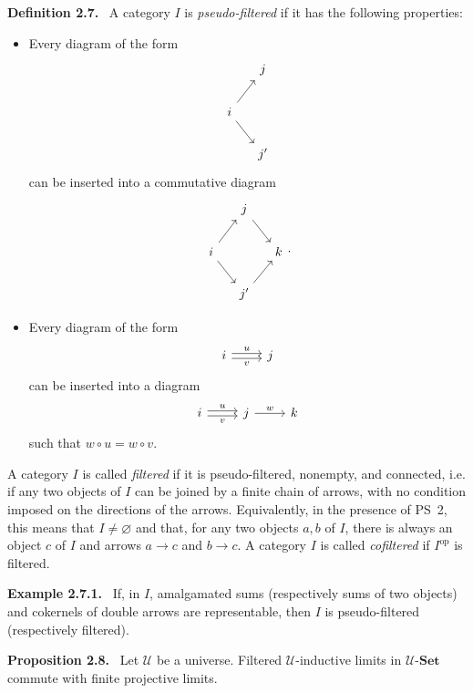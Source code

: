 \documentclass[11pt]{article}
\newcommand{\U}{\mathcal{U}}
\newcommand{\Set}{\mathbf{Set}}
\newcommand{\op}{\mathrm{op}}
\newenvironment{statement}[1]{\par\medskip\noindent\textbf{#1.}\ }{\par\medskip}
\begin{document}
\begin{statement}{Definition 2.7}
A category $I$ is \emph{pseudo-filtered} if it has the following properties:
\begin{itemize}
\item[PS 1)] Every diagram of the form
\[
\begin{tikzcd}[column sep=small]
& j\\
i\arrow[ur]\arrow[dr] & \\
& j'
\end{tikzcd}
\]
can be inserted into a commutative diagram
\[
\begin{tikzcd}[column sep=small]
& j\arrow[dr] & \\
i\arrow[ur]\arrow[dr] && k\\
& j'\arrow[ur] &
\end{tikzcd}.
\]

\item[PS 2)] Every diagram of the form
\[
\begin{tikzcd}
i\arrow[r,shift left=.45ex,"u"]\arrow[r,shift right=.45ex,"v"']&j
\end{tikzcd}
\]
can be inserted into a diagram
\[
\begin{tikzcd}
i\arrow[r,shift left=.45ex,"u"]\arrow[r,shift right=.45ex,"v"']&j\arrow[r,"w"]&k
\end{tikzcd}
\]
such that $w\circ u=w\circ v$.
\end{itemize}
A category $I$ is called \emph{filtered} if it is pseudo-filtered, nonempty, and connected, i.e. if any two objects of $I$ can be joined by a finite chain of arrows, with no condition imposed on the directions of the arrows. Equivalently, in the presence of PS~2, this means that $I\ne\varnothing$ and that, for any two objects $a,b$ of $I$, there is always an object $c$ of $I$ and arrows $a\to c$ and $b\to c$. A category $I$ is called \emph{cofiltered} if $I^{\op}$ is filtered.
\end{statement}

\begin{statement}{Example 2.7.1}
If, in $I$, amalgamated sums (respectively sums of two objects) and cokernels of double arrows are representable, then $I$ is pseudo-filtered (respectively filtered).
\end{statement}

\begin{statement}{Proposition 2.8}
Let $\U$ be a universe. Filtered $\U$-inductive limits in $\U$-$\Set$ commute with finite projective limits.
\end{statement}
\end{document}
